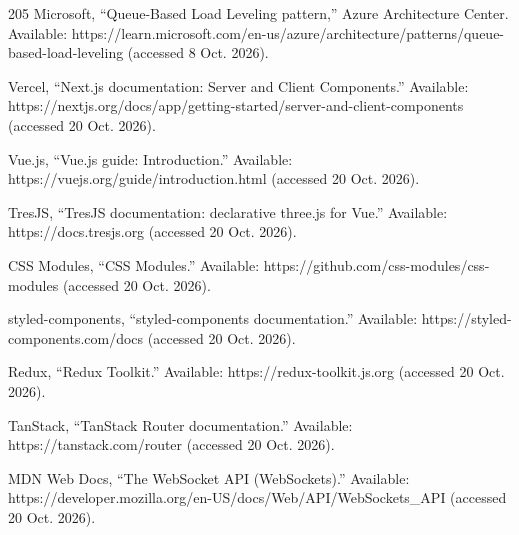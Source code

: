 \begin{thebibliography}{205}
 Microsoft, ``Queue-\allowbreak{}Based Load Leveling pattern,'' Azure Architecture Center. Available: https:/\allowbreak{}/\allowbreak{}learn.\allowbreak{}microsoft.\allowbreak{}com/\allowbreak{}en-\allowbreak{}us/\allowbreak{}azure/\allowbreak{}architecture/\allowbreak{}patterns/\allowbreak{}queue-\allowbreak{}based-\allowbreak{}load-\allowbreak{}leveling (accessed 8 Oct. 2026).

 Vercel, ``Next.js documentation: Server and Client Components.\allowbreak{}'' Available: https:/\allowbreak{}/\allowbreak{}nextjs.\allowbreak{}org/\allowbreak{}docs/\allowbreak{}app/\allowbreak{}getting-\allowbreak{}started/\allowbreak{}server-\allowbreak{}and-\allowbreak{}client-\allowbreak{}components (accessed 20 Oct. 2026).

 Vue.js, ``Vue.js guide: Introduction.\allowbreak{}'' Available: https:/\allowbreak{}/\allowbreak{}vuejs.\allowbreak{}org/\allowbreak{}guide/\allowbreak{}introduction.\allowbreak{}html (accessed 20 Oct. 2026).

 TresJS, ``TresJS documentation: declarative three.js for Vue.'' Available: https:/\allowbreak{}/\allowbreak{}docs.\allowbreak{}tresjs.\allowbreak{}org (accessed 20 Oct. 2026).

 CSS Modules, ``CSS Modules.'' Available: https:/\allowbreak{}/\allowbreak{}github.\allowbreak{}com/\allowbreak{}css-\allowbreak{}modules/\allowbreak{}css-\allowbreak{}modules (accessed 20 Oct. 2026).

 styled-\allowbreak{}components, ``styled-\allowbreak{}components documentation.\allowbreak{}'' Available: https:/\allowbreak{}/\allowbreak{}styled-\allowbreak{}components.\allowbreak{}com/\allowbreak{}docs (accessed 20 Oct. 2026).

 Redux, ``Redux Toolkit.'' Available: https:/\allowbreak{}/\allowbreak{}redux-\allowbreak{}toolkit.\allowbreak{}js.\allowbreak{}org (accessed 20 Oct. 2026).

 TanStack, ``TanStack Router documentation.\allowbreak{}'' Available: https:/\allowbreak{}/\allowbreak{}tanstack.\allowbreak{}com/\allowbreak{}router (accessed 20 Oct. 2026).

 MDN Web Docs, ``The WebSocket API (WebSockets).\allowbreak{}'' Available: https:/\allowbreak{}/\allowbreak{}developer.\allowbreak{}mozilla.\allowbreak{}org/\allowbreak{}en-\allowbreak{}US/\allowbreak{}docs/\allowbreak{}Web/\allowbreak{}API/\allowbreak{}WebSockets\_\allowbreak{}API (accessed 20 Oct. 2026).


\end{thebibliography}
